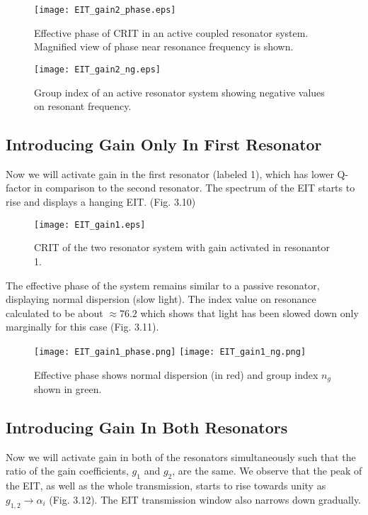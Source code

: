 \begin{figure}[h]
\centering
\texttt{[image: EIT\_gain2\_phase.eps]}
\caption{Effective phase of CRIT in an active coupled resonator system. Magnified view of phase near resonance frequency is shown.}
\end{figure}

     
\begin{figure}[h]
\centering
\texttt{[image: EIT\_gain2\_ng.eps]}
\caption{Group index of an active resonator system showing negative values on resonant frequency.}
\end{figure}


\subsection{Introducing Gain Only In First Resonator}
Now we will activate gain in the first resonator (labeled 1), which has lower Q-factor in comparison to the second resonator. The spectrum of the EIT starts to rise and displays a hanging EIT. (Fig. 3.10)

\begin{figure}[h]
\centering
\texttt{[image: EIT\_gain1.eps]}
\caption{CRIT of the two resonator system with gain activated in resonantor 1.}
\end{figure}

The effective phase of the system remains similar to a passive resonator, displaying normal dispersion (slow light). The index value on resonance calculated to be about $\approx 76.2$ which shows that light has been slowed down only marginally for this case (Fig. 3.11). 

\begin{figure}[h]
\texttt{[image: EIT\_gain1\_phase.png]}
\texttt{[image: EIT\_gain1\_ng.png]}
\caption{Effective phase shows normal dispersion (in red) and group index $n_{g}$ shown in green.}
\end{figure}


\subsection{Introducing Gain In Both Resonators}
Now we will activate gain in both of the resonators simultaneously such that the ratio of the gain coefficients, $g_{1}$ and $g_{2}$, are the same. We observe that the peak of the EIT, as well as the whole transmission, starts to rise towards unity as $g_{1,2} \to \alpha_{i}$ (Fig. 3.12). The EIT transmission window also narrows down gradually.

